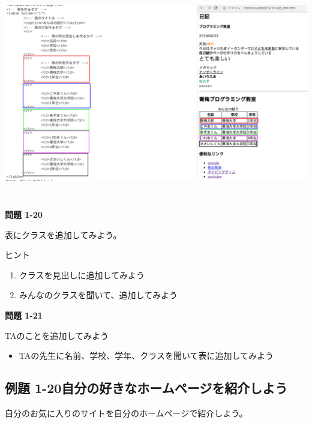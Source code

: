 \documentclass[a4paper,12pt]{jarticle}
\begin{document}
\bigskip


\bigskip
\includegraphics[width=15.861cm,height=9.245cm]{textbook-img192.png}




\bigskip

\bigskip

\bigskip

{\bfseries
  問題 1-20}

表にクラスを追加してみよう。

ヒント

\begin{enumerate}
  \item クラスを見出しに追加してみよう
  \item
        みんなのクラスを聞いて、追加してみよう
\end{enumerate}
{\bfseries
問題 1-21}

TAのことを追加してみよう

\begin{itemize}
  \item
        TAの先生に名前、学校、学年、クラスを聞いて表に追加してみよう
\end{itemize}

\bigskip

\clearpage

\subsection{例題
  1-20自分の好きなホームページを紹介しよう}
自分のお気に入りのサイトを自分のホームページで紹介しよう。
\end{document}
